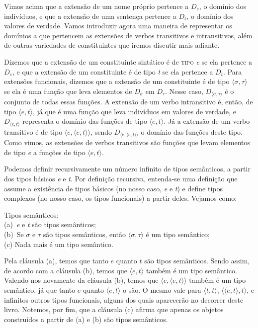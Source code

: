 Vimos acima que a extensão de um nome próprio pertence a $D_{e}$, o
domínio dos indivíduos, e que a extensão de uma sentença pertence
a $D_{t}$, o domínio dos valores de verdade. Vamos introduzir agora
uma maneira de representar os domínios a que pertencem as
extensões de verbos transitivos e intransitivos, além de outras
variedades de constituintes que iremos discutir mais adiante.

Dizemos que a extensão de um constituinte sintático é de
\textsc{tipo} \textit{e} se ela pertence a $D_{e}$, e que a extensão de um
constituinte é de tipo \textit{t} se ela pertence a $D_{t}$. Para extensões funcionais, dizemos que a extensão de um constituinte é de tipo
$\langle\sigma ,\tau\rangle$ se ela é uma função que leva
elementos de $D_{\sigma}$ em $D_{\tau}$. Nesse caso, $D_{\langle\sigma,\tau\rangle}$ é o conjunto de todas essas funções. A extensão
de um verbo intransitivo é, então, de tipo $\langle e,t \rangle$, já
que é uma função que leva indivíduos em valores de verdade, e
$D_{\langle e,t \rangle}$ representa o domínio das funções
de tipo $\langle e,t \rangle$. Já a extensão de um verbo
transitivo é de tipo $\langle e,\langle e,t \rangle\rangle$,
sendo $D_{\langle e,\langle e,t\rangle\rangle}$ o domínio
das funções deste tipo. Como vimos, as extensões de verbos transitivos são funções que levam elementos de tipo \textit{e} a funções de tipo $\langle e,t \rangle$.

Podemos definir recursivamente um número infinito de
tipos semânticos, a partir dos tipos básicos \textit{e} e
\textit{t}. Por definição recursiva, entenda-se uma definição que assume a existência de tipos básicos (no nosso caso, \textit{e} e \textit{t}) e define tipos complexos (no nosso caso, os tipos funcionais) a partir deles. Vejamos como:

\begin{exe}
	\ex Tipos semânticos: \\
	(a)\ \textit{e} e \textit{t} são tipos semânticos; \\
	(b)\ Se $\sigma$ e $\tau$ são tipos semânticos, então $\langle\sigma ,\tau \rangle$ é um tipo semântico; \\
	(c) Nada mais é um tipo semântico.
\end{exe}


\n Pela cláusula (a), temos que tanto $e$ quanto $t$ são tipos semânticos. Sendo assim, de acordo com a cláusula (b), temos que $\langle e,t \rangle$ também é um tipo semântico. Valendo-nos novamente da cláusula (b), temos que $\langle e,\langle e,t \rangle\rangle$ também é um tipo semântico, já que tanto $e$ quanto $\langle e,t \rangle$ o são. O mesmo vale para $\langle t,t \rangle$, $\langle\langle e,t \rangle,t\rangle$, e infinitos outros tipos funcionais, alguns dos quais aparecerão no decorrer deste livro. Notemos, por fim, que a cláusula (c) afirma que apenas os objetos construídos a partir de (a) e (b) são tipos semânticos.

